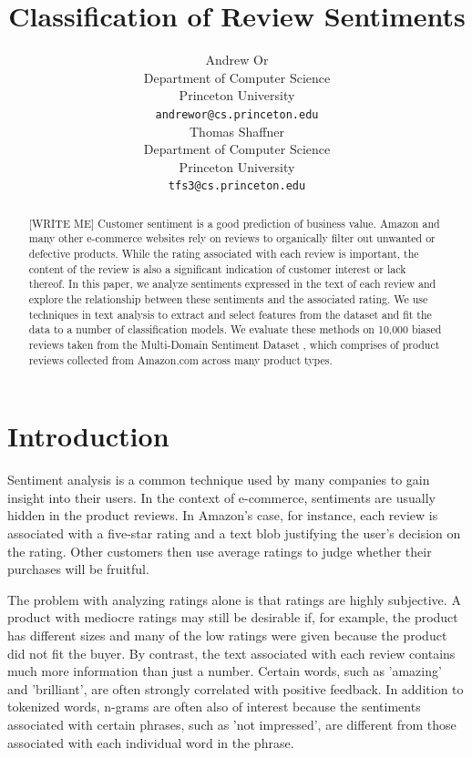\documentclass{article} %
\title{Classification of Review Sentiments}
\author{
Andrew Or\\
Department of Computer Science\\
Princeton University\\
\texttt{andrewor@cs.princeton.edu} \\
\And
Thomas Shaffner \\
Department of Computer Science \\
Princeton University \\
\texttt{tfs3@cs.princeton.edu} \\
}
\begin{document}
\maketitle

\begin{abstract}

[WRITE ME] Customer sentiment is a good prediction of business value. Amazon and many other e-commerce websites rely on reviews to organically filter out unwanted or defective products. While the rating associated with each review is important, the content of the review is also a significant indication of customer interest or lack thereof. In this paper, we analyze sentiments expressed in the text of each review and explore the relationship between these sentiments and the associated rating. We use techniques in text analysis to extract and select features from the dataset and fit the data to a number of classification models. We evaluate these methods on 10,000 biased reviews taken from the Multi-Domain Sentiment Dataset \cite{largedataset}, which comprises of product reviews collected from Amazon.com across many product types.

\end{abstract}
\section{Introduction}

Sentiment analysis is a common technique used by many companies to gain insight into their users. In the context of e-commerce, sentiments are usually hidden in the product reviews. In Amazon's case, for instance, each review is associated with a five-star rating and a text blob justifying the user's decision on the rating. Other customers then use average ratings to judge whether their purchases will be fruitful.

The problem with analyzing ratings alone is that ratings are highly subjective. A product with mediocre ratings may still be desirable if, for example, the product has different sizes and many of the low ratings were given because the product did not fit the buyer. By contrast, the text associated with each review contains much more information than just a number. Certain words, such as 'amazing' and 'brilliant', are often strongly correlated with positive feedback. In addition to tokenized words, n-grams are often also of interest because the sentiments associated with certain phrases, such as 'not impressed', are different from those associated with each individual word in the phrase.
\end{document}

